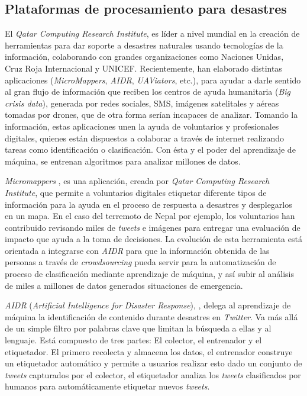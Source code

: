 \subsection{Plataformas de procesamiento para desastres}
\label{arte:PPDesastres}

El \textit{Qatar Computing Research Institute}, es líder a nivel mundial en la creación de herramientas para dar soporte a desastres naturales usando tecnologías de la información, colaborando con grandes organizaciones como Naciones Unidas, Cruz Roja Internacional y UNICEF. Recientemente, han elaborado distintas aplicaciones (\textit{MicroMappers}, \textit{AIDR}, \textit{UAViators}, etc.), para ayudar a darle sentido al gran flujo de información que reciben los centros de ayuda humanitaria (\textit{Big crisis data}), generada por redes sociales, SMS, imágenes satelitales y aéreas tomadas por drones, que de otra forma serían incapaces de analizar.
Tomando la información, estas aplicaciones unen la ayuda de voluntarios y profesionales digitales, quienes están dispuestos a colaborar a través de internet realizando tareas como identificación o clasificación. Con ésta y el poder del aprendizaje de máquina, se entrenan algoritmos para analizar millones de datos.

\textit{Micromappers} \cite{MicroMappers}, es una aplicación, creada por \textit{Qatar Computing Research Institute}, que permite a voluntarios digitales etiquetar diferente tipos de información para la ayuda en el proceso de respuesta a desastres y desplegarlos en un mapa. En el caso del terremoto de Nepal por ejemplo, los voluntarios han contribuido revisando miles de \textit{tweets} e imágenes para entregar una evaluación de impacto que ayuda a la toma de decisiones. La evolución de esta herramienta está orientada a integrarse con \textit{AIDR} para que la información obtenida de las personas a través de \textit{crowdsourcing} pueda servir para la automatización de proceso de clasificación mediante aprendizaje de máquina, y así subir al análisis de miles a millones de datos generados situaciones de emergencia.

\textit{AIDR} (\textit{Artificial Intelligence for Disaster Response}), \cite{AIDR}, delega al aprendizaje de máquina la identificación de contenido durante desastres en \textit{Twitter}. Va más allá de un simple filtro por palabras clave que limitan la búsqueda a ellas y al lenguaje. Está compuesto de tres partes: El colector, el entrenador y el etiquetador. El primero recolecta y almacena los datos, el entrenador construye un etiquetador automático y permite a usuarios realizar esto dado un conjunto de \textit{tweets} capturados por el colector, el etiquetador analiza los \textit{tweets} clasificados por humanos para automáticamente etiquetar nuevos \textit{tweets}.

